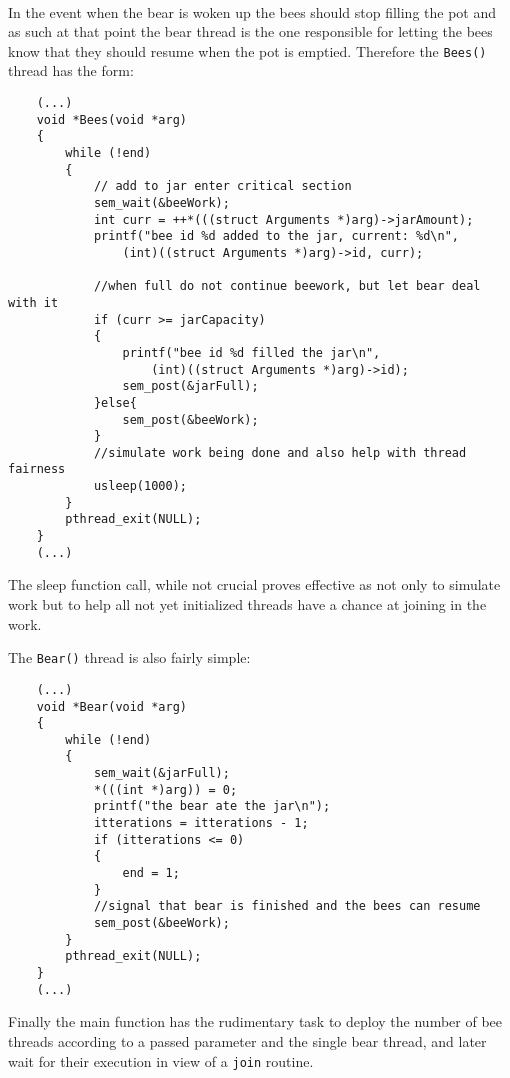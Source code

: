 \documentclass[a4paper,11pt]{article}
\begin{document}
\\

In the event when the bear is woken up the bees should stop filling the pot and as such at that point the bear thread is the one responsible for letting the bees know that they should resume when the pot is emptied. Therefore the {\tt Bees()} thread has the form:

\begin{verbatim}
    (...)
    void *Bees(void *arg)
    {
        while (!end)
        {
            // add to jar enter critical section
            sem_wait(&beeWork);
            int curr = ++*(((struct Arguments *)arg)->jarAmount);
            printf("bee id %d added to the jar, current: %d\n", 
                (int)((struct Arguments *)arg)->id, curr);
    
            //when full do not continue beework, but let bear deal with it
            if (curr >= jarCapacity)
            {
                printf("bee id %d filled the jar\n", 
                    (int)((struct Arguments *)arg)->id);
                sem_post(&jarFull);
            }else{
                sem_post(&beeWork);
            }
            //simulate work being done and also help with thread fairness
            usleep(1000);
        }
        pthread_exit(NULL);
    }
    (...)
\end{verbatim}

The sleep function call, while not crucial proves effective as not only to simulate work but to help all not yet initialized threads have a chance at joining in the work.

The {\tt Bear()} thread is also fairly simple:

\begin{verbatim}
    (...)
    void *Bear(void *arg)
    {
        while (!end)
        {
            sem_wait(&jarFull);
            *(((int *)arg)) = 0;
            printf("the bear ate the jar\n");
            itterations = itterations - 1;
            if (itterations <= 0)
            {
                end = 1;
            }
            //signal that bear is finished and the bees can resume
            sem_post(&beeWork);
        }
        pthread_exit(NULL);
    }
    (...)
\end{verbatim}

Finally the main function has the rudimentary task to deploy the number of bee threads according to a passed parameter and the single bear thread, and later wait for their execution in view of a {\tt join} routine.
\end{document}
